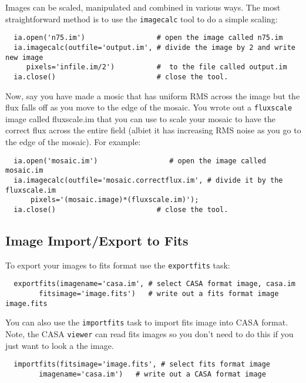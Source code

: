 Images can be scaled, manipulated and combined in various ways.  The
most straightforward method is to use the {\tt imagecalc} tool to do a
simple scaling: 

\small
\begin{verbatim}
  ia.open('n75.im')                 # open the image called n75.im
  ia.imagecalc(outfile='output.im', # divide the image by 2 and write new image 
     pixels='infile.im/2')          #  to the file called output.im
  ia.close()                        # close the tool. 
\end{verbatim}
\normalsize

Now, say you have made a mosic that has uniform RMS across the image
but the flux falls off as you move to the edge of the mosaic.  You
wrote out a {\tt fluxscale} image called fluxscale.im that you can
use to scale your mosaic to have the correct flux across the entire
field (albiet it has increasing RMS noise as you go to the edge of the
mosaic).  For example: 

\small
\begin{verbatim}
  ia.open('mosaic.im')                 # open the image called mosaic.im
  ia.imagecalc(outfile='mosaic.correctflux.im', # divide it by the fluxscale.im
      pixels='(mosaic.image)*(fluxscale.im)');
  ia.close()                        # close the tool. 
\end{verbatim}
\normalsize


\subsection{Image Import/Export to Fits}
\label{subsection:image.export.fits}

To export your images to fits format use the {\tt exportfits} task:

\small
\begin{verbatim}
  exportfits(imagename='casa.im', # select CASA format image, casa.im
        fitsimage='image.fits')   # write out a fits format image image.fits
\end{verbatim}
\normalsize

You can also use the {\tt importfits} task to import fits image into
CASA format.  Note, the CASA {\tt viewer} can read fits images so you
don't need to do this if you just want to look a the image.  

\small
\begin{verbatim}
  importfits(fitsimage='image.fits', # select fits format image
        imagename='casa.im')   # write out a CASA format image
\end{verbatim}
\normalsize

